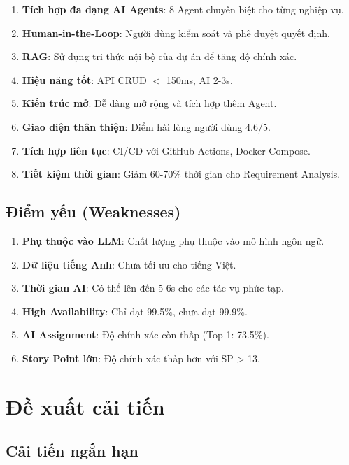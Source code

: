 \documentclass[12pt,a4paper]{report}
\begin{document}
\begin{enumerate}
\item \textbf{Tích hợp đa dạng AI Agents}: 8 Agent chuyên biệt cho từng nghiệp vụ.
\item \textbf{Human-in-the-Loop}: Người dùng kiểm soát và phê duyệt quyết định.
\item \textbf{RAG}: Sử dụng tri thức nội bộ của dự án để tăng độ chính xác.
\item \textbf{Hiệu năng tốt}: API CRUD $<$ 150ms, AI 2-3s.
\item \textbf{Kiến trúc mở}: Dễ dàng mở rộng và tích hợp thêm Agent.
\item \textbf{Giao diện thân thiện}: Điểm hài lòng người dùng 4.6/5.
\item \textbf{Tích hợp liên tục}: CI/CD với GitHub Actions, Docker Compose.
\item \textbf{Tiết kiệm thời gian}: Giảm 60-70\% thời gian cho Requirement Analysis.
\end{enumerate}

\subsection{Điểm yếu (Weaknesses)}

\begin{enumerate}
\item \textbf{Phụ thuộc vào LLM}: Chất lượng phụ thuộc vào mô hình ngôn ngữ.
\item \textbf{Dữ liệu tiếng Anh}: Chưa tối ưu cho tiếng Việt.
\item \textbf{Thời gian AI}: Có thể lên đến 5-6s cho các tác vụ phức tạp.
\item \textbf{High Availability}: Chỉ đạt 99.5\%, chưa đạt 99.9\%.
\item \textbf{AI Assignment}: Độ chính xác còn thấp (Top-1: 73.5\%).
\item \textbf{Story Point lớn}: Độ chính xác thấp hơn với SP > 13.
\end{enumerate}

\section{Đề xuất cải tiến}

\subsection{Cải tiến ngắn hạn}
\end{document}
